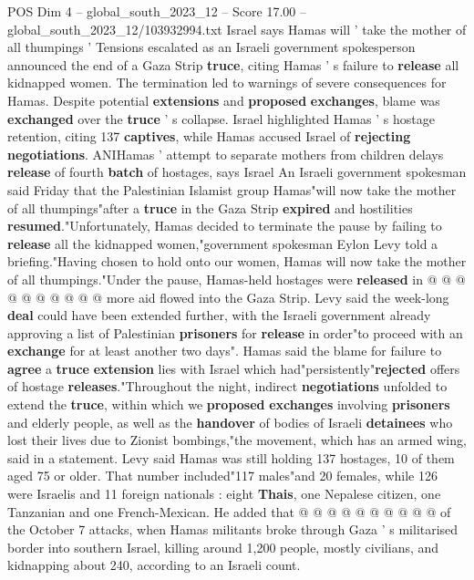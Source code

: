 \begin{textsample}{POS Dim 4 – global\_south\_2023\_12 – Score 17.00 – global\_south\_2023\_12/103932994.txt}  \label{ex:f4_pos_148}
Israel says Hamas will ' take the mother of all thumpings ' Tensions escalated as an Israeli government spokesperson announced the end of a Gaza Strip \textbf{truce}, citing Hamas ' s failure to \textbf{release} all kidnapped women.
The termination led to warnings of severe consequences for Hamas.
Despite potential \textbf{extensions} and \textbf{proposed} \textbf{exchanges}, blame was \textbf{exchanged} over the \textbf{truce} ' s collapse.
Israel highlighted Hamas ' s hostage retention, citing 137 \textbf{captives}, while Hamas accused Israel of \textbf{rejecting} \textbf{negotiations}.
ANIHamas ' attempt to separate mothers from children delays \textbf{release} of fourth \textbf{batch} of hostages, says Israel An Israeli government spokesman said Friday that the Palestinian Islamist group Hamas"will now take the mother of all thumpings"after a \textbf{truce} in the Gaza Strip \textbf{expired} and hostilities \textbf{resumed}."Unfortunately, Hamas decided to terminate the pause by failing to \textbf{release} all the kidnapped women,"government spokesman Eylon Levy told a briefing."Having chosen to hold onto our women, Hamas will now take the mother of all thumpings."Under the pause, Hamas-held hostages were \textbf{released} in @ @ @ @ @ @ @ @ @ @ more aid flowed into the Gaza Strip.
Levy said the week-long \textbf{deal} could have been extended further, with the Israeli government already approving a list of Palestinian \textbf{prisoners} for \textbf{release} in order"to proceed with an \textbf{exchange} for at least another two days".
Hamas said the blame for failure to \textbf{agree} a \textbf{truce} \textbf{extension} lies with Israel which had"persistently"\textbf{rejected} offers of hostage \textbf{releases}."Throughout the night, indirect \textbf{negotiations} unfolded to extend the \textbf{truce}, within which we \textbf{proposed} \textbf{exchanges} involving \textbf{prisoners} and elderly people, as well as the \textbf{handover} of bodies of Israeli \textbf{detainees} who lost their lives due to Zionist bombings,"the movement, which has an armed wing, said in a statement.
Levy said Hamas was still holding 137 hostages, 10 of them aged 75 or older.
That number included"117 males"and 20 females, while 126 were Israelis and 11 foreign nationals : eight \textbf{Thais}, one Nepalese citizen, one Tanzanian and one French-Mexican.
He added that @ @ @ @ @ @ @ @ @ @ of the October 7 attacks, when Hamas militants broke through Gaza ' s militarised border into southern Israel, killing around 1,200 people, mostly civilians, and kidnapping about 240, according to an Israeli count.

\end{textsample}
